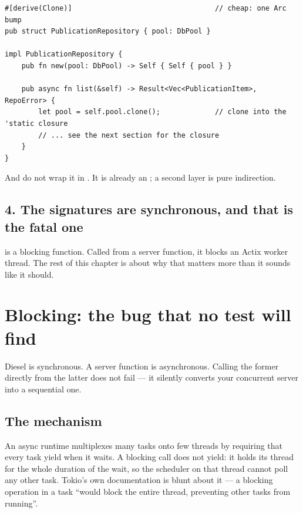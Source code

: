 \begin{pattern}
\begin{lstlisting}[style=rs]
#[derive(Clone)]                                  // cheap: one Arc bump
pub struct PublicationRepository { pool: DbPool }

impl PublicationRepository {
    pub fn new(pool: DbPool) -> Self { Self { pool } }

    pub async fn list(&self) -> Result<Vec<PublicationItem>, RepoError> {
        let pool = self.pool.clone();             // clone into the 'static closure
        // ... see the next section for the closure
    }
}
\end{lstlisting}
And do not wrap it in . It is already an ; a second layer is pure
indirection.
\end{pattern}

\subsection*{4. The signatures are synchronous, and that is the fatal one}

 is a blocking function. Called from a
server function, it blocks an Actix worker thread. The rest of this chapter is about why that
matters more than it sounds like it should.

\section{Blocking: the bug that no test will find}

\begin{keyidea}
Diesel is synchronous. A server function is asynchronous. Calling the former directly from the
latter does not fail --- it silently converts your concurrent server into a sequential one.
\end{keyidea}

\subsection{The mechanism}

An async runtime multiplexes many tasks onto few threads by requiring that every task yield when
it waits. A blocking call does not yield: it holds its thread for the whole duration of the wait,
so the scheduler on that thread cannot poll any other task. Tokio's own documentation is blunt
about it --- a blocking operation in a task ``would block the entire thread, preventing other tasks
from running''.

